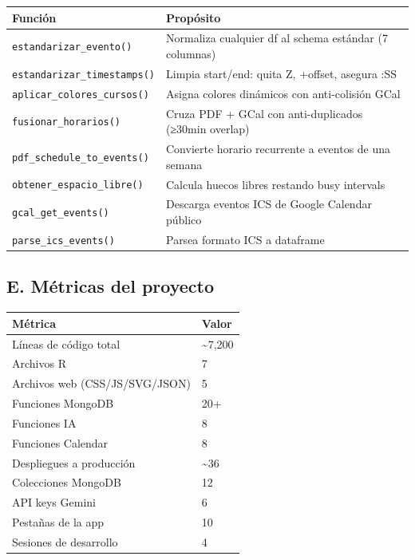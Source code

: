 \documentclass[
  spanish,
  11pt,
  a4paper,
]{article}
\newcounter{none} %
\begin{document}
{\def\LTcaptype{none} %
\begin{longtable}[]{@{}
  >{\raggedright\arraybackslash}p{}
  >{\raggedright\arraybackslash}p{}@{}}
\toprule\noalign{}
\begin{minipage}[b]{\linewidth}\raggedright
Función
\end{minipage} & \begin{minipage}[b]{\linewidth}\raggedright
Propósito
\end{minipage} \\
\midrule\noalign{}
\endhead
\bottomrule\noalign{}
\endlastfoot
\texttt{estandarizar\_evento()} & Normaliza cualquier df al schema
estándar (7 columnas) \\
\texttt{estandarizar\_timestamps()} & Limpia start/end: quita Z,
+offset, asegura :SS \\
\texttt{aplicar\_colores\_cursos()} & Asigna colores dinámicos con
anti-colisión GCal \\
\texttt{fusionar\_horarios()} & Cruza PDF + GCal con anti-duplicados
(≥30min overlap) \\
\texttt{pdf\_schedule\_to\_events()} & Convierte horario recurrente a
eventos de una semana \\
\texttt{obtener\_espacio\_libre()} & Calcula huecos libres restando busy
intervals \\
\texttt{gcal\_get\_events()} & Descarga eventos ICS de Google Calendar
público \\
\texttt{parse\_ics\_events()} & Parsea formato ICS a dataframe \\
\end{longtable}
}

\subsection{E. Métricas del proyecto}\label{e.-muxe9tricas-del-proyecto}

{\def\LTcaptype{none} %
\begin{longtable}[]{@{}ll@{}}
\toprule\noalign{}
Métrica & Valor \\
\midrule\noalign{}
\endhead
\bottomrule\noalign{}
\endlastfoot
Líneas de código total & \textasciitilde7,200 \\
Archivos R & 7 \\
Archivos web (CSS/JS/SVG/JSON) & 5 \\
Funciones MongoDB & 20+ \\
Funciones IA & 8 \\
Funciones Calendar & 8 \\
Despliegues a producción & \textasciitilde36 \\
Colecciones MongoDB & 12 \\
API keys Gemini & 6 \\
Pestañas de la app & 10 \\
Sesiones de desarrollo & 4 \\
\end{longtable}
}
\end{document}
